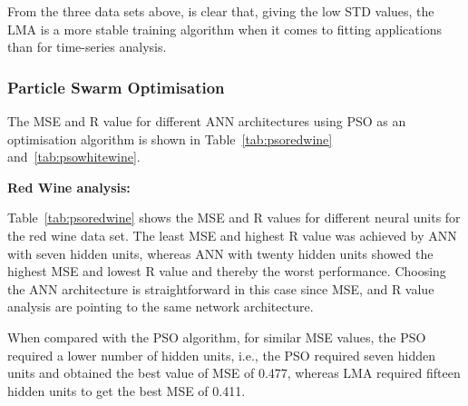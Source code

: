 From the three data sets above, is clear that, giving the low STD values, the LMA is a more stable training algorithm when it comes to fitting applications than for time-series analysis.  

\begin{table}[htbp]
    \centering
    \caption{Summary of tests performed with LMA for white wine test data set}
    \label{tab:lmawhitewine}
    
\end{table}

\subsubsection{Particle Swarm Optimisation}

The MSE and R value for different ANN architectures using PSO as an optimisation algorithm is shown in Table~\ref{tab:psoredwine} and~\ref{tab:psowhitewine}.

\textbf{Red Wine analysis:}

Table~\ref{tab:psoredwine} shows the MSE and R values for different neural units for the red wine data set. The least MSE and highest R value was achieved by ANN with seven hidden units, whereas ANN with twenty hidden units showed the highest MSE and lowest R value and thereby the worst performance. Choosing the ANN architecture is straightforward in this case since MSE, and R value analysis are pointing to the same network architecture.

When compared with the PSO algorithm, for similar MSE values, the PSO required a lower number of hidden units, i.e., the PSO required  seven hidden units and obtained the best value of MSE of 0.477, whereas LMA required fifteen hidden units to get the best MSE of 0.411.

